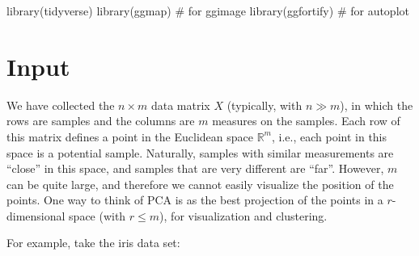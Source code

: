 \documentclass[
  letterpaper,
  DIV=11,
  numbers=noendperiod]{scrreprt}
\newenvironment{Shaded}{\begin{snugshade}}{\end{snugshade}}
\newcommand{\AttributeTok}[1]{\textcolor[rgb]{0.40,0.45,0.13}{#1}}
\newcommand{\CommentTok}[1]{\textcolor[rgb]{0.37,0.37,0.37}{#1}}
\newcommand{\FunctionTok}[1]{\textcolor[rgb]{0.28,0.35,0.67}{#1}}
\newcommand{\NormalTok}[1]{\textcolor[rgb]{0.00,0.23,0.31}{#1}}
\newcommand{\OtherTok}[1]{\textcolor[rgb]{0.00,0.23,0.31}{#1}}
\newcommand{\SpecialCharTok}[1]{\textcolor[rgb]{0.37,0.37,0.37}{#1}}
\newcommand{\StringTok}[1]{\textcolor[rgb]{0.13,0.47,0.30}{#1}}
\begin{document}
\begin{Shaded}
\begin{Highlighting}[]
\FunctionTok{library}\NormalTok{(tidyverse)}
\FunctionTok{library}\NormalTok{(ggmap) }\CommentTok{\# for ggimage}
\FunctionTok{library}\NormalTok{(ggfortify) }\CommentTok{\# for autoplot}
\end{Highlighting}
\end{Shaded}

\hypertarget{input}{%
\section{Input}\label{input}}

We have collected the \(n \times m\) data matrix \(X\) (typically, with
\(n \gg m\)), in which the rows are samples and the columns are \(m\)
measures on the samples. Each row of this matrix defines a point in the
Euclidean space \(\mathbb R^m\), i.e., each point in this space is a
potential sample. Naturally, samples with similar measurements are
``close'' in this space, and samples that are very different are
``far''. However, \(m\) can be quite large, and therefore we cannot
easily visualize the position of the points. One way to think of PCA is
as the best projection of the points in a \(r\)-dimensional space (with
\(r \leq m\)), for visualization and clustering.

For example, take the iris data set:

\begin{Shaded}
\end{Shaded}
\end{document}
